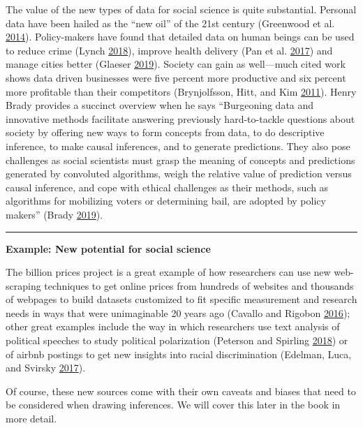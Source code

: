 \documentclass[]{krantz}
\begin{document}
The value of the new types of data for social science is quite
substantial. Personal data have been hailed as the ``new oil'' of the
21st century (Greenwood et al.
\protect\hyperlink{ref-greenwood2014}{2014}). Policy-makers have found
that detailed data on human beings can be used to reduce crime (Lynch
\protect\hyperlink{ref-lynch2018}{2018}), improve health delivery (Pan
et al. \protect\hyperlink{ref-pan2017}{2017}) and manage cities better
(Glaeser \protect\hyperlink{ref-glaeser2019urban}{2019}). Society can
gain as well---much cited work shows data driven businesses were five
percent more productive and six percent more profitable than their
competitors (Brynjolfsson, Hitt, and Kim
\protect\hyperlink{ref-brynjolfsson2011strength}{2011}). Henry Brady
provides a succinct overview when he says ``Burgeoning data and
innovative methods facilitate answering previously hard-to-tackle
questions about society by offering new ways to form concepts from data,
to do descriptive inference, to make causal inferences, and to generate
predictions. They also pose challenges as social scientists must grasp
the meaning of concepts and predictions generated by convoluted
algorithms, weigh the relative value of prediction versus causal
inference, and cope with ethical challenges as their methods, such as
algorithms for mobilizing voters or determining bail, are adopted by
policy makers'' (Brady
\protect\hyperlink{ref-brady2019challenge}{2019}).

\begin{center}\rule{0.5\linewidth}{\linethickness}\end{center}

\textbf{Example: New potential for social science}

The billion prices project is a great example of how researchers can use
new web-scraping techniques to get online prices from hundreds of
websites and thousands of webpages to build datasets customized to fit
specific measurement and research needs in ways that were unimaginable
20 years ago (Cavallo and Rigobon
\protect\hyperlink{ref-cavallo2016billion}{2016}); other great examples
include the way in which researchers use text analysis of political
speeches to study political polarization (Peterson and Spirling
\protect\hyperlink{ref-peterson2018classification}{2018}) or of airbnb
postings to get new insights into racial discrimination (Edelman, Luca,
and Svirsky \protect\hyperlink{ref-edelman2017racial}{2017}).

Of course, these new sources come with their own caveats and biases that
need to be considered when drawing inferences. We will cover this later
in the book in more detail.
\end{document}
